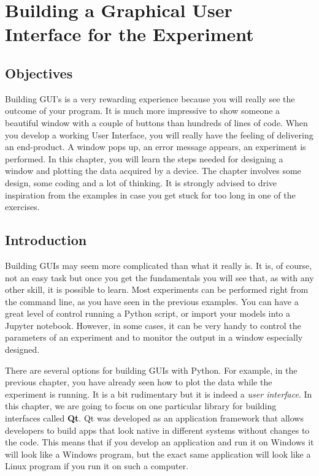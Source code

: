 \chapter[A GUI for the Experiment]{Building a Graphical User Interface for the Experiment}\label{chapter:gui}

\section{Objectives}
Building {GUI}'s is a very rewarding experience because you will really
see the outcome of your program. It is much more impressive to show someone a beautiful window with a couple of buttons than hundreds of
lines of code. When you develop a working User Interface, you will
really have the feeling of delivering an end-product. A window pops up,
an error message appears, an experiment is performed. In this chapter,
you will learn the steps needed for designing a window and plotting the
data acquired by a device. The chapter involves some design, some coding
and a lot of thinking. It is strongly advised to drive inspiration from
the examples in case you get stuck for too long in one of the exercises.

\section{Introduction}
Building GUIs may seem more complicated than what it really is. It is,
of course, not an easy task but once you get the fundamentals you will
see that, as with any other skill, it is possible to learn. Most
experiments can be performed right from the command line, as you have
seen in the previous examples. You can have a great level of control
running a Python script, or import your models into a Jupyter notebook.
However, in some cases, it can be very handy to control the parameters
of an experiment and to monitor the output in a window
especially designed.

There are several options for building GUIs with Python. For example, in
the previous chapter, you have already seen how to plot the data while
the experiment is running. It is a bit rudimentary but it is indeed a
\emph{user interface}. In this chapter, we are going to focus on one
particular library for building interfaces called \textbf{Qt}. Qt was
developed as an application framework that allows developers to build
apps that look native in different systems without changes to the code.
This means that if you develop an application and run it on Windows it
will look like a Windows program, but the exact same application will
look like a Linux program if you run it on such a computer.

